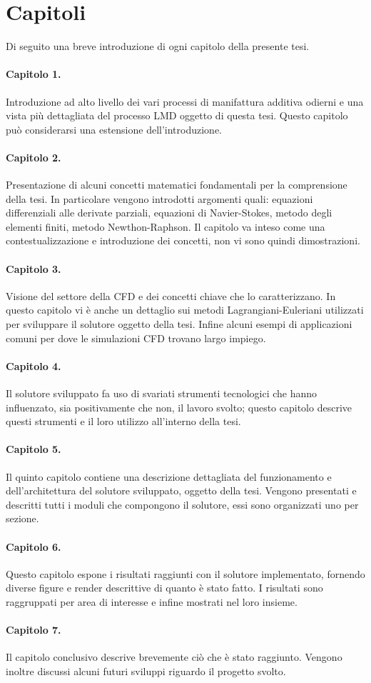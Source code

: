 \section{Capitoli}\label{capitoli}
Di seguito una breve introduzione di ogni capitolo della presente tesi.
\paragraph{Capitolo 1.} Introduzione ad alto livello dei vari processi di manifattura additiva odierni e una vista più dettagliata
del processo LMD oggetto di questa tesi. Questo capitolo può considerarsi una estensione dell'introduzione. 
\paragraph{Capitolo 2.} Presentazione di alcuni concetti matematici fondamentali per la comprensione della tesi. In particolare vengono
introdotti argomenti quali: equazioni differenziali alle derivate parziali, equazioni di Navier-Stokes, metodo degli elementi finiti, metodo Newthon-Raphson. 
Il capitolo va inteso come una contestualizzazione e introduzione dei concetti, non vi sono quindi dimostrazioni. 
\paragraph{Capitolo 3.} Visione del settore della CFD e dei concetti chiave che lo caratterizzano. In questo capitolo vi è anche
un dettaglio sui metodi Lagrangiani-Euleriani utilizzati per sviluppare il solutore oggetto della tesi. Infine alcuni esempi di applicazioni comuni per 
dove le simulazioni CFD trovano largo impiego.  
\paragraph{Capitolo 4.} Il solutore sviluppato fa uso di svariati strumenti tecnologici che hanno influenzato, sia positivamente che non, il lavoro svolto; questo capitolo
descrive questi strumenti e il loro utilizzo all'interno della tesi.
\paragraph{Capitolo 5.} Il quinto capitolo contiene una descrizione dettagliata del funzionamento e dell'architettura del solutore sviluppato, oggetto della tesi.
Vengono presentati e descritti tutti i moduli che compongono il solutore, essi sono organizzati uno per sezione. 
\paragraph{Capitolo 6.} Questo capitolo espone i risultati raggiunti con il solutore implementato, fornendo diverse figure e render descrittive di quanto è stato fatto.
I risultati sono raggruppati per area di interesse e infine mostrati nel loro insieme.
\paragraph{Capitolo 7.} Il capitolo conclusivo descrive brevemente ciò che è stato raggiunto. Vengono inoltre discussi alcuni
futuri sviluppi riguardo il progetto svolto.
